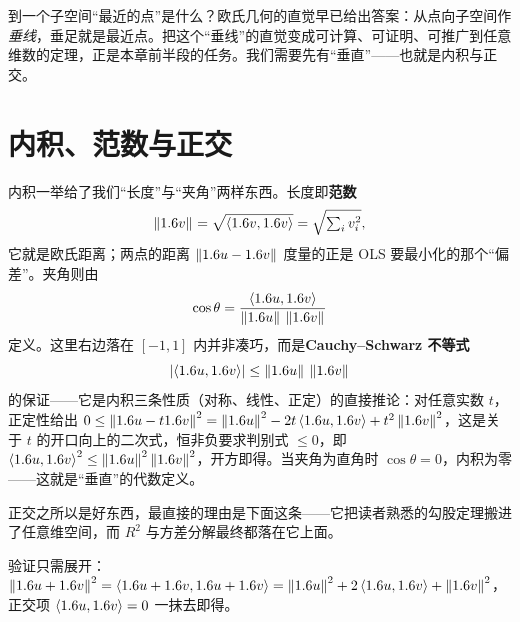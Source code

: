 到一个子空间``最近的点''是什么？欧氏几何的直觉早已给出答案：从点向子空间作\emph{垂线}，垂足就是最近点。把这个``垂线''的直觉变成可计算、可证明、可推广到任意维数的定理，正是本章前半段的任务。我们需要先有``垂直''——也就是内积与正交。

\section{内积、范数与正交}
\label{sec:proj-inner}


内积一举给了我们``长度''与``夹角''两样东西。长度即\textbf{范数}
\[
    \left\|1.6 v\right\|_{}=\sqrt{\left\langle 1.6 v,1.6 v\right\rangle}=\sqrt{\textstyle\sum_i v_i^2},
\]
它就是欧氏距离；两点的距离 $\left\|1.6 u-1.6 v\right\|_{}$ 度量的正是 OLS 要最小化的那个``偏差''。夹角则由
\[
    \cos\theta=\frac{\left\langle 1.6 u,1.6 v\right\rangle}{\left\|1.6 u\right\|_{}\,\left\|1.6 v\right\|_{}}
\]
定义。这里右边落在 $[-1,1]$ 内并非凑巧，而是\textbf{Cauchy–Schwarz 不等式}
\[
    \left|\left\langle 1.6 u,1.6 v\right\rangle\right|\le\left\|1.6 u\right\|_{}\,\left\|1.6 v\right\|_{}
\]
的保证——它是内积三条性质（对称、线性、正定）的直接推论：对任意实数 $t$，正定性给出 $0\le\left\|1.6 u-t1.6 v\right\|_{}^2=\left\|1.6 u\right\|_{}^2-2t\left\langle 1.6 u,1.6 v\right\rangle+t^2\left\|1.6 v\right\|_{}^2$，这是关于 $t$ 的开口向上的二次式，恒非负要求判别式 $\le0$，即 $\left\langle 1.6 u,1.6 v\right\rangle^2\le\left\|1.6 u\right\|_{}^2\left\|1.6 v\right\|_{}^2$，开方即得。当夹角为直角时 $\cos\theta=0$，内积为零——这就是``垂直''的代数定义。


正交之所以是好东西，最直接的理由是下面这条——它把读者熟悉的勾股定理搬进了任意维空间，而 $R^2$ 与方差分解最终都落在它上面。

\noindent 验证只需展开：$\left\|1.6 u+1.6 v\right\|_{}^2=\left\langle 1.6 u+1.6 v,1.6 u+1.6 v\right\rangle=\left\|1.6 u\right\|_{}^2+2\left\langle 1.6 u,1.6 v\right\rangle+\left\|1.6 v\right\|_{}^2$，正交项 $\left\langle 1.6 u,1.6 v\right\rangle=0$ 一抹去即得。

